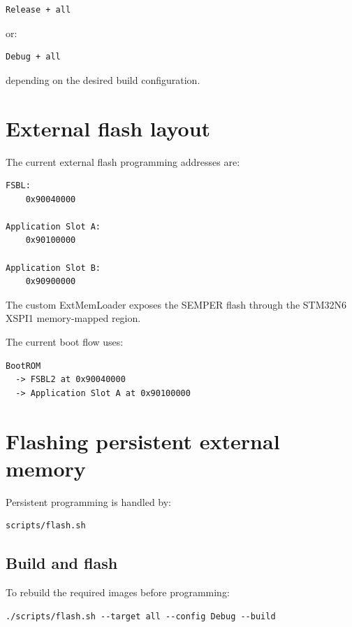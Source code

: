 \documentclass[10pt,a4paper,oneside]{report}
\begin{document}
\begin{verbatim}
Release + all
\end{verbatim}

or:

\begin{verbatim}
Debug + all
\end{verbatim}

depending on the desired build configuration.

\section{External flash layout}\label{wiki-getting-started-build-flash-debug--4-external-flash-layout}

The current external flash programming addresses are:

\begin{verbatim}
FSBL:
    0x90040000

Application Slot A:
    0x90100000

Application Slot B:
    0x90900000
\end{verbatim}

The custom ExtMemLoader exposes the SEMPER flash through the STM32N6 XSPI1 memory-mapped region.

The current boot flow uses:

\begin{verbatim}
BootROM
  -> FSBL2 at 0x90040000
  -> Application Slot A at 0x90100000
\end{verbatim}

\section{Flashing persistent external memory}\label{wiki-getting-started-build-flash-debug--5-flashing-persistent-external-memory}

Persistent programming is handled by:

\begin{verbatim}
scripts/flash.sh
\end{verbatim}

\subsection{Build and flash}\label{wiki-getting-started-build-flash-debug--build-and-flash}

To rebuild the required images before programming:

\begin{verbatim}
./scripts/flash.sh --target all --config Debug --build
\end{verbatim}
\end{document}
